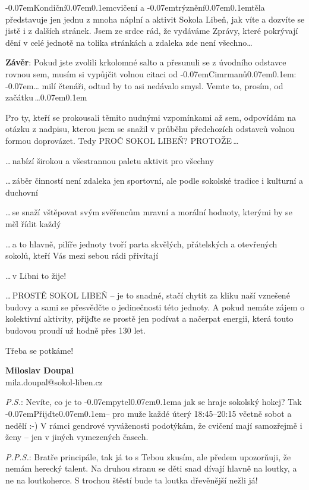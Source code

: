 \documentclass[11pt]{article}
\newcommand{\signature}[2]{%
  \begin{flushright}
    \textbf{#1}\\#2
  \end{flushright}
}
\newcommand{\luv}{\clqq\kern-0.07em}
\newcommand{\ruv}{\kern0.07em\crqq\kern0.1em}
\begin{document}
\luv Kondiční\ruv cvičení a \luv trýznění\ruv těla představuje jen jednu z mnoha náplní a aktivit Sokola Libeň, jak víte a dozvíte se jistě i z dalších stránek. Jsem ze srdce rád, že vydáváme Zprávy, které pokrývají dění v celé jednotě na tolika stránkách a zdaleka zde není všechno\ldots{}

\textbf{Závěr}: Pokud jste zvolili krkolomné salto a přesunuli se z úvodního odstavce rovnou sem, musím si vypůjčit volnou citaci od \luv Cimrmanů\ruv: \luv \ldots{} milí čtenáři, odtud by to asi nedávalo smysl. Vemte to, prosím, od začátku\,\ldots{}\ruv

Pro ty, kteří se prokousali těmito nudnými vzpomínkami až sem, odpovídám na otázku z nadpisu, kterou jsem se snažil v průběhu předchozích odstavců volnou formou doprovázet. Tedy PROČ SOKOL LIBEŇ? PROTOŽE\,\ldots{}

\ldots{}\,nabízí širokou a všestrannou paletu aktivit pro všechny

\ldots{}\,záběr činností není zdaleka jen sportovní, ale podle sokolské tradice i kulturní a duchovní

\ldots{}\,se snaží vštěpovat svým svěřencům mravní a morální hodnoty, kterými by se měl řídit každý

\ldots{}\,a to hlavně, pilíře jednoty tvoří parta skvělých, přátelských a otevřených sokolů, kteří Vás mezi sebou rádi přivítají

\ldots{}\,v Libni to žije!

\ldots{}\,PROSTĚ SOKOL LIBEŇ – je to snadné, stačí chytit za kliku naší vznešené budovy a sami se přesvědčte o jedinečnosti této jednoty. A pokud nemáte zájem o kolektivní aktivity, přijďte se prostě jen podívat a načerpat energii, která touto budovou proudí už hodně přes 130 let.

Třeba se potkáme!

\signature{Miloslav Doupal}{mila.doupal@sokol-liben.cz}

\noindent \textit{P.S.}: Nevíte, co je to \luv pytel\ruv a jak se hraje sokolský hokej? Tak \luv Přijďte\ruv – pro muže každé úterý 18:45–20:15 včetně sobot a nedělí :-) V rámci gendrové vyváženosti podotýkám, že cvičení mají samozřejmě i ženy – jen v jiných vymezených časech.

\vspace*{12pt}

\noindent \textit{P.P.S.}: Bratře principále, tak já to s Tebou zkusím, ale předem upozorňuji, že nemám herecký talent. Na druhou stranu se děti snad dívají hlavně na loutky, a ne na loutkoherce. S trochou štěstí bude ta loutka dřevěnější nežli já!
\end{document}
